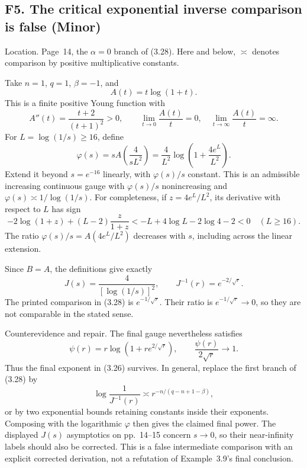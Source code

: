 \documentclass[10pt]{article}
\begin{document}
\subsection*{F5. The critical exponential inverse comparison is false (Minor)}
Location. Page 14, the \(\alpha=0\) branch of (3.28). Here and below, \(\asymp\) denotes comparison by positive multiplicative constants.\par
Take \(n=1\), \(q=1\), \(\beta=-1\), and \[A(t)=t\log(1+t).\] This is a finite positive Young function with \[A''(t)=\frac{t+2}{(t+1)^2}>0,\qquad
 \lim_{t\to0}\frac{A(t)}t=0,\quad
 \lim_{t\to\infty}\frac{A(t)}t=\infty.\] For \(L=\log(1/s)\ge16\), define \[\varphi(s)=sA\!\left(\frac4{sL^2}\right)
 =\frac4{L^2}\log\!\left(1+\frac{4e^L}{L^2}\right).\] Extend it beyond \(s=e^{-16}\) linearly, with \(\varphi(s)/s\) constant. This is an admissible increasing continuous gauge with \(\varphi(s)/s\) nonincreasing and \(\varphi(s)\asymp1/\log(1/s)\). For completeness, if \(z=4e^L/L^2\), its derivative with respect to \(L\) has sign \[-2\log(1+z)+(L-2)\frac{z}{1+z}
 <-L+4\log L-2\log4-2<0
 \quad(L\ge16).\] The ratio \(\varphi(s)/s=A(4e^L/L^2)\) decreases with \(s\), including across the linear extension.\par
Since \(B=A\), the definitions give exactly \[J(s)=\frac4{[\log(1/s)]^2},\qquad
 J^{-1}(r)=e^{-2/\sqrt r}.\] The printed comparison in (3.28) is \(e^{-1/\sqrt r}\). Their ratio is \(e^{-1/\sqrt r}\to0\), so they are not comparable in the stated sense.\par
Counterevidence and repair. The final gauge nevertheless satisfies \[\psi(r)=r\log(1+re^{2/\sqrt r}),\qquad
 \frac{\psi(r)}{2\sqrt r}\longrightarrow1.\] Thus the final exponent in (3.26) survives. In general, replace the first branch of (3.28) by \[\log\frac1{J^{-1}(r)}
 \asymp r^{-n/(q-n+1-\beta)},\] or by two exponential bounds retaining constants inside their exponents. Composing with the logarithmic \(\varphi\) then gives the claimed final power. The displayed \(J(s)\) asymptotics on pp. 14–15 concern \(s\to0\), so their near-infinity labels should also be corrected. This is a false intermediate comparison with an explicit corrected derivation, not a refutation of Example 3.9’s final conclusion.\par
\end{document}
